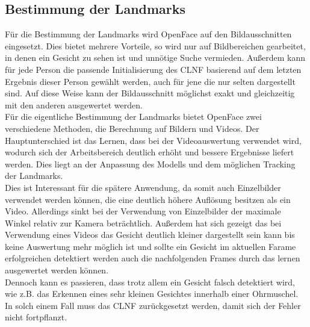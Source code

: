 \subsection{Bestimmung der Landmarks}
\label{bestimmung_Landmarks}
Für die Bestimmung der Landmarks wird OpenFace auf den Bildausschnitten eingesetzt. Dies bietet mehrere Vorteile, so wird nur auf Bildbereichen gearbeitet, in denen ein Gesicht zu sehen ist und unnötige Suche vermieden. Außerdem kann für jede Person die passende Initialisierung des CLNF basierend auf dem letzten Ergebnis dieser Person gewählt werden, auch für jene die nur selten dargestellt sind. Auf diese Weise kann der Bildausschnitt möglichst exakt und gleichzeitig mit den anderen ausgewertet werden.\\
Für die eigentliche Bestimmung der Landmarks bietet OpenFace zwei verschiedene Methoden, die Berechnung auf Bildern und Videos. Der Hauptunterschied ist das Lernen, dass bei der Videoauswertung verwendet wird, wodurch sich der Arbeitsbereich deutlich erhöht und bessere Ergebnisse liefert werden. Dies liegt an der Anpassung des Modells und dem möglichen Tracking der Landmarks.\\
Dies ist Interessant für die spätere Anwendung, da somit auch Einzelbilder verwendet werden können, die eine deutlich höhere Auflösung besitzen als ein Video. Allerdings sinkt bei der Verwendung von Einzelbilder der maximale Winkel relativ zur Kamera beträchtlich. Außerdem hat sich gezeigt das bei Verwendung eines Videos das Gesicht deutlich kleiner dargestellt sein kann bis keine Auswertung mehr möglich ist und sollte ein Gesicht im aktuellen Farame erfolgreichen detektiert werden auch die nachfolgenden Frames durch das lernen ausgewertet werden können.\\
Dennoch kann es passieren, dass trotz allem ein Gesicht falsch detektiert wird, wie z.B. das Erkennen eines sehr kleinen Gesichtes innerhalb einer Ohrmuschel. In solch einem Fall muss das CLNF zurückgesetzt werden, damit sich der Fehler nicht fortpflanzt.
